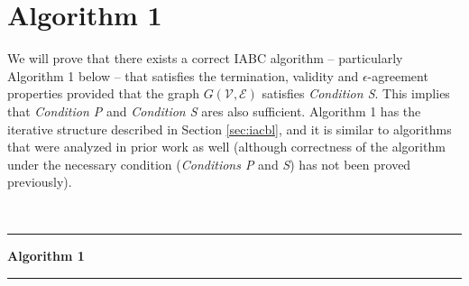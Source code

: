 \documentclass{llncs}
\newcommand{\scripte}{\mathcal{E}}
\newcommand{\scriptv}{\mathcal{V}}
\begin{document}
\section{Algorithm 1}
\label{s:algorithm1}

We will prove that there exists a correct IABC algorithm – particularly Algorithm 1 below – that satisfies the termination, validity and
$\epsilon$-agreement properties provided that the graph $G(\scriptv, \scripte)$ satisfies {\em Condition S}. This implies that
{\em Condition P} and {\em Condition S} ares also sufficient. Algorithm 1 has the iterative structure described in Section \ref{sec:iacbl}, and
it is similar to algorithms that were analyzed in prior work as
well \cite{vaidya_PODC12,Tseng_general} (although correctness of the algorithm under
the necessary condition ({\em Conditions P} and {\em S}) has not been proved previously).




~

\hrule
{\bf Algorithm 1}
\vspace*{4pt}\hrule
\end{document}
